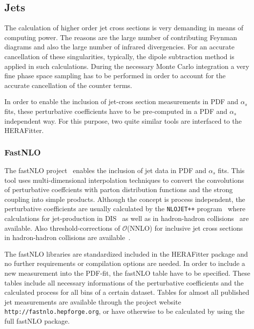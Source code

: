 \documentclass[11pt,a4paper]{article}
\begin{document}
\subsection{Jets}
The calculation of higher order jet cross sections is very demanding
in means of computing power. The reasons are the large number of contributing
Feynman diagrams and also the large number of infrared divergencies.
For an accurate cancellation of these singularities, typically, the 
dipole subtraction method is applied in such calculations.
During the necessary Monte Carlo integration a very fine phase
space sampling has to be performed in order to account for the
accurate cancellation of the counter terms.

In order to enable the inclusion of jet-cross section 
measurements in PDF and $\alpha_s$ fits, these perturbative
coefficients have to be pre-computed in a PDF and $\alpha_s$ 
independent way. For this purpose, two quite similar tools are
interfaced to the HERAFitter.

\subsubsection{FastNLO}
The fastNLO project~\cite{Kluge:2006xs,Wobisch:2011ij,Britzger:2012bs}
enables the inclusion of jet data in PDF and $\alpha_s$ fits.
This tool uses multi-dimensional interpolation
techniques to convert the convolutions of perturbative 
coeffcients with parton distribution functions and 
the strong coupling into simple products.
Although the concept is process independent, the perturbative 
coefficients are usually calculated by the \texttt{NLOJET++}
program~\cite{Nagy:1998bb} where calculations for jet-production
in DIS~\cite{Nagy:2001xb}  as well as in hadron-hadron 
collisions~\cite{Nagy:2003tz,Nagy:2001fj} are available.
Also threshold-corrections of $\mathcal{O}$(NNLO) for 
inclusive jet cross sections in hadron-hadron collisions are
available~\cite{Kidonakis:2000gi}.

The fastNLO libraries are standardized included in the HERAFitter
package and no further requirements or compilation options
are needed. In order to include a new measurement into the PDF-fit,
the fastNLO table have to be specified. These tables include all
necessary informations of the perturbative coefficients and the
calculated process for all bins of a certain dataset. 
Tables for almost all published jet measurements
are available through the project website {\tt http://fastnlo.hepforge.org},
or have otherwise to be calculated by using the full fastNLO package.
\end{document}
